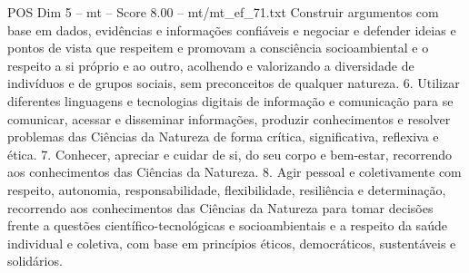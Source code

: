 \begin{textsample}{POS Dim 5 – mt – Score 8.00 – mt/mt\_ef\_71.txt}
Construir argumentos com base em dados, evidências e informações confiáveis e negociar e defender ideias e pontos de vista que respeitem e promovam a consciência socioambiental e o respeito a si próprio e ao outro, acolhendo e valorizando a diversidade de indivíduos e de grupos sociais, sem preconceitos de qualquer natureza. 6.
Utilizar diferentes linguagens e tecnologias digitais de informação e comunicação para se comunicar, acessar e disseminar informações, produzir conhecimentos e resolver problemas das Ciências da Natureza de forma crítica, significativa, reflexiva e ética. 7.
Conhecer, apreciar e cuidar de si, do seu corpo e bem-estar, recorrendo aos conhecimentos das Ciências da Natureza. 8.
Agir pessoal e coletivamente com respeito, autonomia, responsabilidade, flexibilidade, resiliência e determinação, recorrendo aos conhecimentos das Ciências da Natureza para tomar decisões frente a questões científico-tecnológicas e socioambientais e a respeito da saúde individual e coletiva, com base em princípios éticos, democráticos, sustentáveis e solidários.

\end{textsample}
